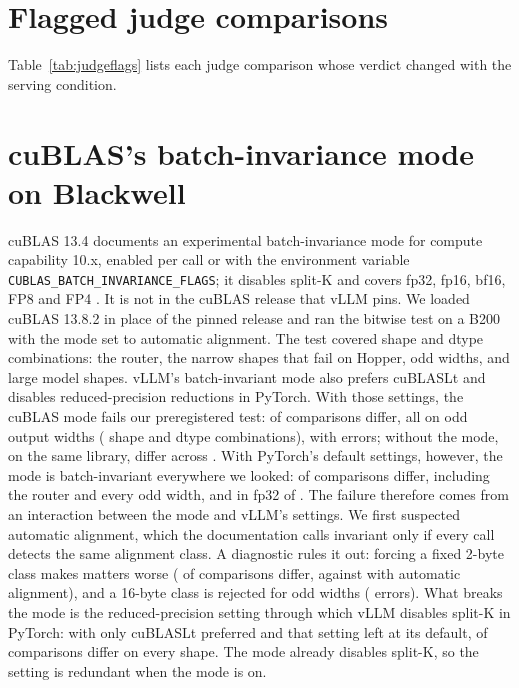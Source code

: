 \section{Flagged judge comparisons}\label{app:effects}
Table~\ref{tab:judgeflags} lists each judge comparison whose verdict changed with the serving condition.
\begin{table}[h]\centering\small
\resizebox{\linewidth}{!}{}
\caption{Judge comparisons that changed with the serving condition under Holm correction within each run. Difference: mean MQM score of the first system minus the second in C2, with a 95\% bootstrap interval over segments.}\label{tab:judgeflags}
\end{table}


\section{cuBLAS's batch-invariance mode on Blackwell}\label{app:blackwell}\label{sec:cublasmode}
cuBLAS 13.4 documents an experimental batch-invariance mode for compute capability 10.x, enabled per call or with the environment variable \texttt{CUBLAS\_BATCH\_INVARIANCE\_FLAGS}; it disables split-K and covers fp32, fp16, bf16, FP8 and FP4 \citep{nvidia2026cublas}. It is not in the cuBLAS release that vLLM pins. We loaded cuBLAS 13.8.2 in place of the pinned release and ran the bitwise test on a B200 with the mode set to automatic alignment. The test covered \OneEShapes{} shape and dtype combinations: the router, the narrow shapes that fail on Hopper, odd widths, and large model shapes. vLLM's batch-invariant mode also prefers cuBLASLt and disables reduced-precision reductions in PyTorch. With those settings, the cuBLAS mode fails our preregistered test: \OneEBadC{} of \OneECompC{} comparisons differ, all on odd output widths (\OneEBadShapesC{} shape and dtype combinations), with \OneEErrC{} errors; without the mode, on the same library, \OneEBadB{} differ across \OneEBadShapesB{}. With PyTorch's default settings, however, the mode is batch-invariant everywhere we looked: \OneEBadD{} of \OneECompD{} comparisons differ, including the router and every odd width, and in fp32 \OneEBadE{} of \OneECompE{}. The failure therefore comes from an interaction between the mode and vLLM's settings. We first suspected automatic alignment, which the documentation calls invariant only if every call detects the same alignment class. A diagnostic rules it out: forcing a fixed 2-byte class makes matters worse (\FAlignTwoBad{} of \FAutoComp{} comparisons differ, against \FAutoBad{} with automatic alignment), and a 16-byte class is rejected for odd widths (\FAlignSixteenErr{} errors). What breaks the mode is the reduced-precision setting through which vLLM disables split-K in PyTorch: with only cuBLASLt preferred and that setting left at its default, \FLtBad{} of \FLtComp{} comparisons differ on every shape. The mode already disables split-K, so the setting is redundant when the mode is on.

